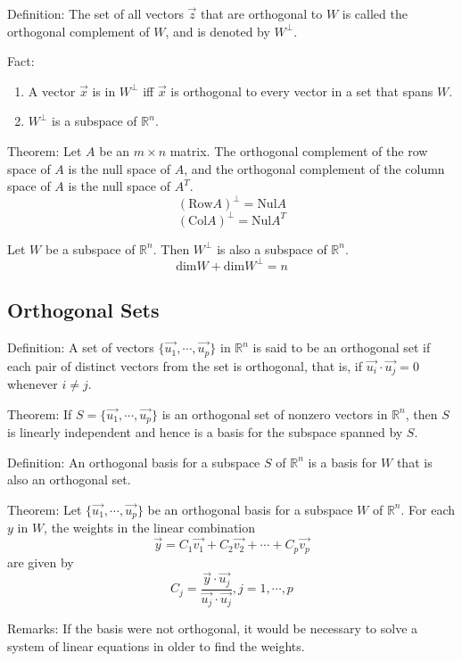 \documentclass[12pt]{article}
\begin{document}
Definition: The set of all vectors $\vec{z}$ that are orthogonal to $W$ is called the orthogonal complement of $W$, and is denoted by $W^\perp$.

Fact:
\begin{enumerate}
    \item A vector $\vec{x}$ is in $W^\perp$ iff $\vec{x}$ is orthogonal to every vector in a set that spans $W$. 
    \item $W^\perp$ is a subspace of $\mathbb{R}^n$.
\end{enumerate}


Theorem: Let $A$ be an $m\times n$ matrix. The orthogonal complement of the row space of $A$ is the null space of $A$, and the orthogonal complement of the column space of $A$ is the null space of $A^T$.
$$(\text{Row}A)^\perp = \text{Nul}A$$
$$(\text{Col}A)^\perp = \text{Nul}A^T$$

Let $W$ be a subspace of $\mathbb{R}^n$. Then $W^\perp$ is also a subspace of $\mathbb{R}^n$.
$$\text{dim}W + \text{dim}W^\perp = n$$







\subsection{Orthogonal Sets}
Definition: A set of vectors $\{\vec{u_1}, \cdots, \vec{u_p}\}$ in $\mathbb{R}^n$ is said to be an orthogonal set if each pair of distinct vectors from the set is orthogonal, that is, if $\vec{u_i}\cdot\vec{u_j} = 0$ whenever $i \neq j$.

Theorem: If $S = \{\vec{u_1}, \cdots, \vec{u_p}\}$ is an orthogonal set of nonzero vectors in $\mathbb{R}^n$, then $S$ is linearly independent and hence is a basis for the subspace spanned by $S$.


Definition: An orthogonal basis for a subspace $S$ of $\mathbb{R}^n$ is a basis for $W$ that is also an orthogonal set.


Theorem: Let $\{\vec{u_1}, \cdots, \vec{u_p}\}$ be an orthogonal basis for a subspace $W$ of $\mathbb{R}^n$. For each $y$ in $W$, the weights in the linear combination $$\vec{y} = C_1 \vec{v_1} + C_2 \vec{v_2} + \cdots + C_p \vec{v_p}$$
are given by $$C_j = \dfrac{\vec{y}\cdot\vec{u_j}}{\vec{u_j}\cdot\vec{u_j}}, j = 1,\cdots, p$$

Remarks: If the basis were not orthogonal, it would be necessary to solve a system of linear equations in older to find the weights.
\end{document}
